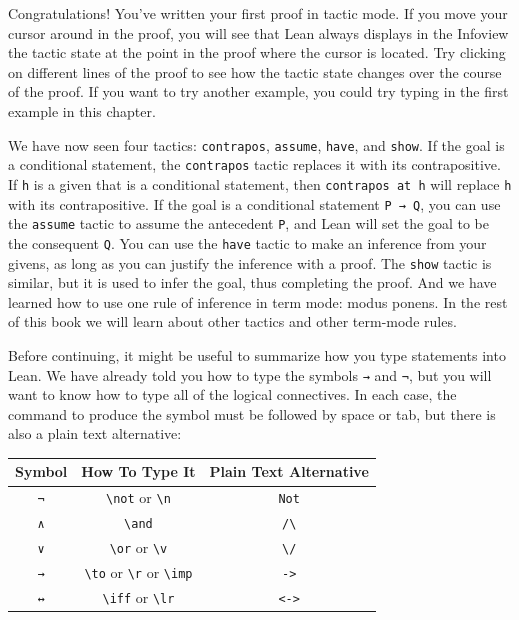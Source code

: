 \documentclass[
  letterpaper,
  DIV=11,
  numbers=noendperiod]{scrreprt}
\newcommand{\excl}[1]{}
\theoremstyle{remark}
\begin{document}
Congratulations! You've written your first proof in tactic mode. If you
move your cursor around in the proof, you will see that Lean always
displays in the Infoview the tactic state at the point in the proof
where the cursor is located. Try clicking on different lines of the
proof to see how the tactic state changes over the course of the proof.
If you want to try another example, you could try typing in the first
example in this chapter.

We have now seen four tactics: \texttt{contrapos}, \texttt{assume},
\texttt{have}, and \texttt{show}. If the goal is a conditional
statement, the \texttt{contrapos} tactic replaces it with its
contrapositive. If \texttt{h} is a given that is a conditional
statement, then \texttt{contrapos\ at\ h} will replace \texttt{h} with
its contrapositive. If the goal is a conditional statement
\texttt{P\ →\ Q}, you can use the \texttt{assume} tactic to assume the
antecedent \texttt{P}, and Lean will set the goal to be the consequent
\texttt{Q}. You can use the \texttt{have} tactic to make an inference
from your givens, as long as you can justify the inference with a proof.
The \texttt{show} tactic is similar, but it is used to infer the goal,
thus completing the proof. And we have learned how to use one rule of
inference in term mode: modus ponens. In the rest of this book we will
learn about other tactics and other term-mode rules.

Before continuing, it might be useful to summarize how you type
statements into Lean. We have already told you how to type the symbols
\texttt{→} and \texttt{¬}, but you will want to know how to type all of
the logical connectives. In each case, the command to produce the symbol
must be followed by space or tab, but there is also a plain text
alternative:

\begin{longtable}[]{@{}ccc@{}}
\toprule()
Symbol & How To Type It & Plain Text Alternative \\
\midrule()
\endhead
\texttt{¬} & \texttt{\textbackslash{}not} or \texttt{\textbackslash{}n}
& \texttt{Not} \\
\texttt{∧} & \texttt{\textbackslash{}and} &
\texttt{/\textbackslash{}} \\
\texttt{∨} & \texttt{\textbackslash{}or} or \texttt{\textbackslash{}v} &
\texttt{\textbackslash{}/} \\
\texttt{→} & \texttt{\textbackslash{}to} or \texttt{\textbackslash{}r}
or \texttt{\textbackslash{}imp} &
\excl{\texttt{-\textgreater{}}}\texttt{-\null>} \\
\texttt{↔} & \texttt{\textbackslash{}iff} or \texttt{\textbackslash{}lr}
& \excl{\texttt{\textless{}-\textgreater{}}}\texttt{<-\null>} \\
\bottomrule()
\end{longtable}
\end{document}
